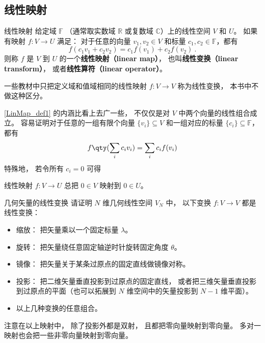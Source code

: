
\begin{issues}
\end{issues}



\subsection{线性映射}
\begin{definition}{线性映射}\label{LinMap_def1}
给定域 $\mathbb F$ （通常取实数域 $\mathbb R$ 或复数域 $\mathbb C$）上的线性空间 $V$ 和 $U$。 如果有映射 $f:V\rightarrow U$ 满足： 对于任意的向量 ${v}_1, {v}_2\in V$ 和标量 $c_1, c_2 \in \mathbb{F}$，都有
\begin{equation}
f(c_1 {v}_1+c_2 {v}_2)=c_1f({v}_1)+c_2f({v}_2)~.
\end{equation}
则称 $f$ 是 $V$ 到 $U$ 的一个\textbf{线性映射（linear map）}， 也叫\textbf{线性变换（linear transform）}， 或者\textbf{线性算符（linear operator）}。
\end{definition}
一些教材中只把定义域和值域相同的线性映射 $f:V\to V$ 称为线性变换， 本书中不做这种区分。

\autoref{LinMap_def1} 的内涵比看上去广一些， 不仅仅是对 $V$ 中两个向量的线性组合成立。 容易证明对于任意的一组有限个向量 $\{{v}_i\}\subseteq V$ 和一组对应的标量 $\{c_i\}\subseteq\mathbb{F}$，都有
\begin{equation}\label{LinMap_eq1}
f\qty(\sum_i c_i {v}_i)=\sum_i c_i f({v}_i)
\end{equation}
特殊地， 若令所有 $c_i = 0$ 可得
\begin{corollary}{}\label{LinMap_cor1}
线性映射 $f:V\to U$ 总把 $0 \in V$ 映射到 $0 \in U$。
\end{corollary}

\begin{exercise}{几何矢量的线性变换}
请证明 $N$ 维几何线性空间 $V_N$ 中， 以下变换 $f:V\to V$ 都是线性变换：
\begin{itemize}
\item 缩放： 把矢量乘以一个固定标量 $\lambda$。
\item 旋转： 把矢量绕任意固定轴逆时针旋转固定角度 $\theta$。
\item 镜像： 把矢量关于某条过原点的固定直线做镜像对称。
\item 投影： 把二维矢量垂直投影到过原点的固定直线， 或者把三维矢量垂直投影到过原点的平面（也可以拓展到 $N$ 维空间中的矢量投影到 $N-1$ 维平面）。
\item 以上几种变换的任意组合。
\end{itemize}
\end{exercise}
注意在以上映射中， 除了投影外都是双射， 且都把零向量映射到零向量。 多对一映射也会把一些非零向量映射到零向量。


